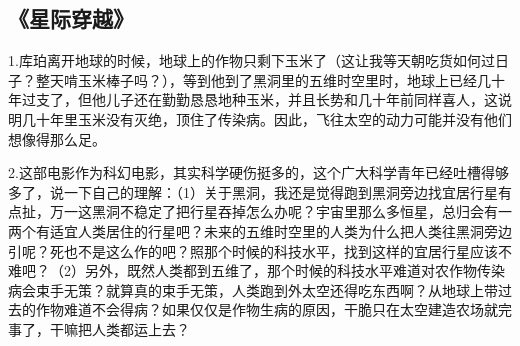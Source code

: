 \subsection{《星际穿越》}
1.库珀离开地球的时候，地球上的作物只剩下玉米了（这让我等天朝吃货如何过日子？整天啃玉米棒子吗？），等到他到了黑洞里的五维时空里时，地球上已经几十年过支了，但他儿子还在勤勤恳恳地种玉米，并且长势和几十年前同样喜人，这说明几十年里玉米没有灭绝，顶住了传染病。因此，飞往太空的动力可能并没有他们想像得那么足。

2.这部电影作为科幻电影，其实科学硬伤挺多的，这个广大科学青年已经吐槽得够多了，说一下自己的理解：（1）关于黑洞，我还是觉得跑到黑洞旁边找宜居行星有点扯，万一这黑洞不稳定了把行星吞掉怎么办呢？宇宙里那么多恒星，总归会有一两个有适宜人类居住的行星吧？未来的五维时空里的人类为什么把人类往黑洞旁边引呢？死也不是这么作的吧？照那个时候的科技水平，找到这样的宜居行星应该不难吧？（2）另外，既然人类都到五维了，那个时候的科技水平难道对农作物传染病会束手无策？就算真的束手无策，人类跑到外太空还得吃东西啊？从地球上带过去的作物难道不会得病？如果仅仅是作物生病的原因，干脆只在太空建造农场就完事了，干嘛把人类都运上去？